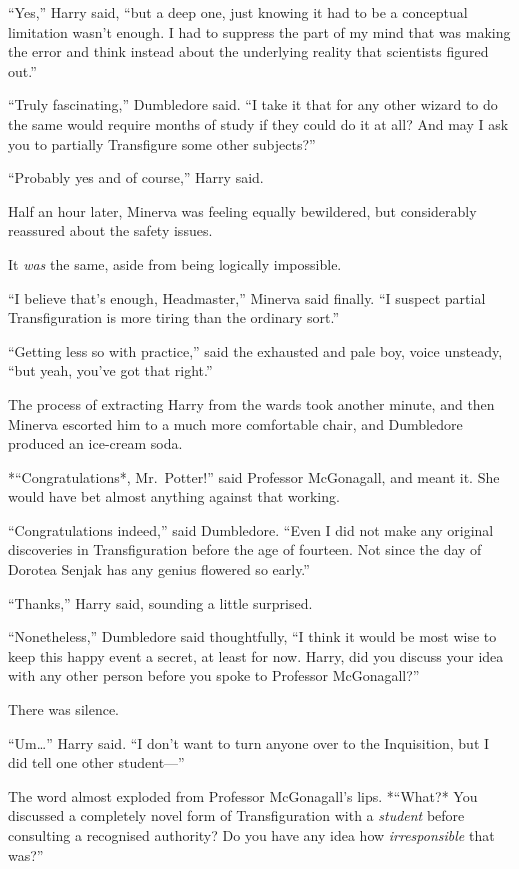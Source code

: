 ``Yes,'' Harry said, ``but a deep one, just knowing it had to be a
conceptual limitation wasn't enough. I had to suppress the part of my
mind that was making the error and think instead about the underlying
reality that scientists figured out.''

``Truly fascinating,'' Dumbledore said. ``I take it that for any other
wizard to do the same would require months of study if they could do it
at all? And may I ask you to partially Transfigure some other
subjects?''

``Probably yes and of course,'' Harry said.

Half an hour later, Minerva was feeling equally bewildered, but
considerably reassured about the safety issues.

It \emph{was} the same, aside from being logically impossible.

``I believe that's enough, Headmaster,'' Minerva said finally. ``I
suspect partial Transfiguration is more tiring than the ordinary sort.''

``Getting less so with practice,'' said the exhausted and pale boy,
voice unsteady, ``but yeah, you've got that right.''

The process of extracting Harry from the wards took another minute, and
then Minerva escorted him to a much more comfortable chair, and
Dumbledore produced an ice-cream soda.

*``Congratulations*, Mr.~Potter!'' said Professor McGonagall, and meant
it. She would have bet almost anything against that working.

``Congratulations indeed,'' said Dumbledore. ``Even I did not make any
original discoveries in Transfiguration before the age of fourteen. Not
since the day of Dorotea Senjak has any genius flowered so early.''

``Thanks,'' Harry said, sounding a little surprised.

``Nonetheless,'' Dumbledore said thoughtfully, ``I think it would be
most wise to keep this happy event a secret, at least for now. Harry,
did you discuss your idea with any other person before you spoke to
Professor McGonagall?''

There was silence.

``Um\ldots{}'' Harry said. ``I don't want to turn anyone over to the
Inquisition, but I did tell one other student---''

The word almost exploded from Professor McGonagall's lips. *``What?* You
discussed a completely novel form of Transfiguration with a
\emph{student} before consulting a recognised authority? Do you have any
idea how \emph{irresponsible} that was?''

